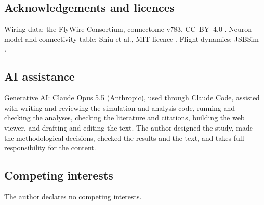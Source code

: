 \documentclass[11pt,letterpaper]{article}
\begin{document}
\subsection{Acknowledgements and
licences}\label{acknowledgements-and-licences}

\noindent Wiring data: the FlyWire Consortium, connectome v783,
CC~BY~4.0 \cite{dorkenwald2024,schlegel2024}. Neuron model and
connectivity table: Shiu et al., MIT licence \cite{shiu2024}. Flight
dynamics: JSBSim \cite{jsbsim2026}.

\subsection{AI assistance}\label{ai-assistance}

\noindent Generative AI: Claude Opus 5.5 (Anthropic), used through
Claude Code, assisted with writing and reviewing the simulation and
analysis code, running and checking the analyses, checking the
literature and citations, building the web viewer, and drafting and
editing the text. The author designed the study, made the methodological
decisions, checked the results and the text, and takes full
responsibility for the content.

\subsection{Competing interests}\label{competing-interests}

\noindent The author declares no competing interests.
\end{document}
